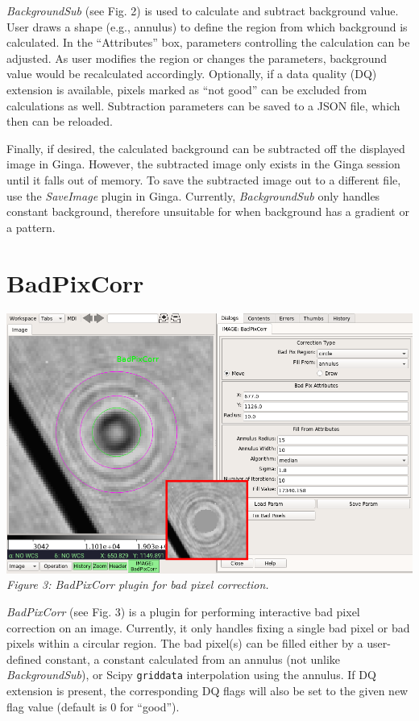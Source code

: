 \documentclass[]{article}
\begin{document}
\begin{multicols}{3}
\para
{\em BackgroundSub} (see Fig. 2) is used to calculate and subtract background
value. User draws a shape (e.g., annulus) to define
the region from which background is calculated. In the ``Attributes'' box,
parameters controlling the calculation can be adjusted.
As user modifies the region or changes the parameters, background value would
be recalculated accordingly.
Optionally, if a data quality (DQ) extension is available, pixels marked as
``not good'' can be excluded from calculations as well.
Subtraction parameters can be saved to a JSON file, which then can be reloaded.

\para
Finally, if desired, the calculated background can be subtracted off
the displayed image in Ginga. However, the subtracted image only exists in the
Ginga session until it falls out of memory.
To save the subtracted image out to a different file, use the {\em SaveImage}
plugin in Ginga.
Currently, {\em BackgroundSub} only handles constant background, therefore
unsuitable for when background has a gradient or a pattern.

\section*{BadPixCorr}

\begin{center}
\includegraphics[width=8in]{plugin_badpixcorr.png}
\label{fig:plugin_badpixcorr}
\vspace*{0.4em}
{\small\em Figure 3: BadPixCorr plugin for bad pixel correction.}
\end{center}

\para
{\em BadPixCorr} (see Fig. 3) is a plugin for performing interactive bad pixel
correction on an image. Currently, it only handles fixing a single bad pixel or
bad pixels within a circular region.
The bad pixel(s) can be filled either by a user-defined constant, a constant
calculated from an annulus (not unlike {\em BackgroundSub}), or Scipy
{\tt griddata} interpolation using the annulus.
If DQ extension is present, the corresponding DQ flags will also be set
to the given new flag value (default is 0 for ``good'').


\end{multicols}
\end{document}
